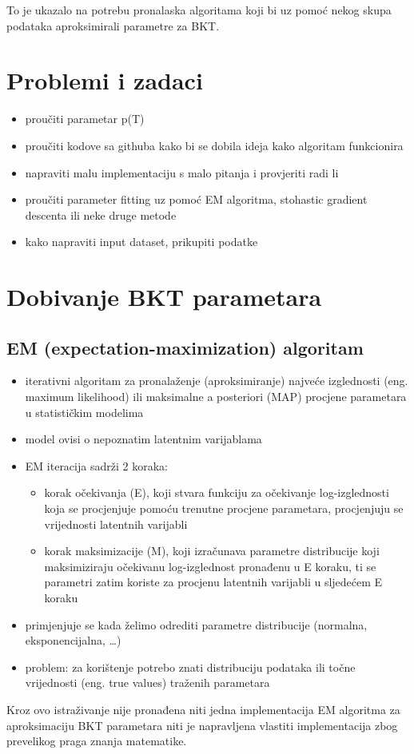 \documentclass[times, utf8,projekt]{fer}
\begin{document}
To je ukazalo na potrebu pronalaska algoritama koji bi uz pomoć nekog skupa podataka aproksimirali parametre za BKT.
\section{Problemi i zadaci}
\begin{itemize}
	\item proučiti parametar p(T)
	\item proučiti kodove sa githuba kako bi se dobila ideja kako algoritam funkcionira
	\item napraviti malu implementaciju s malo pitanja i provjeriti radi li
	\item proučiti parameter fitting uz pomoć EM algoritma, stohastic gradient descenta ili neke druge metode
	\item kako napraviti input dataset, prikupiti podatke
	
	
\end{itemize}
\section{Dobivanje BKT parametara}
\subsection{EM (expectation-maximization) algoritam}

\begin{itemize}
	\item iterativni algoritam za pronalaženje (aproksimiranje) najveće izglednosti (eng. maximum likelihood) ili maksimalne a posteriori (MAP) procjene parametara u statističkim modelima
	\item model ovisi o nepoznatim latentnim varijablama
	\item EM iteracija sadrži 2 koraka:
	\begin{itemize}
		\item 	korak očekivanja (E), koji stvara funkciju za očekivanje log-izglednosti koja se procjenjuje pomoću trenutne procjene parametara, procjenjuju se vrijednosti latentnih varijabli
		\item 	korak maksimizacije (M), koji izračunava parametre distribucije koji maksimiziraju očekivanu log-izglednost pronađenu u E koraku, ti se parametri zatim koriste za procjenu latentnih varijabli u sljedećem E koraku
	\end{itemize}
	
	\item primjenjuje se kada želimo odrediti parametre distribucije (normalna, eksponencijalna, …)
	\item problem: za korištenje potrebo znati distribuciju podataka ili točne vrijednosti (eng. true values) traženih parametara
	
\end{itemize}
Kroz ovo istraživanje nije pronađena niti jedna implementacija EM algoritma za aproksimaciju BKT parametara niti je napravljena vlastiti implementacija zbog prevelikog praga znanja matematike.
\end{document}
